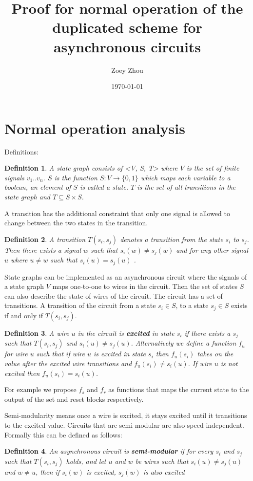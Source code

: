 \documentclass{article}
\title{Proof for normal operation of the duplicated scheme for asynchronous circuits}
\author{Zoey Zhou}
\date{\today}
\newtheorem*{definition}{Definition}
\begin{document}
\section{Normal operation analysis}
Definitions:  
\begin{definition}A state graph consists of <V, S, T> where $V$ is the set of finite signals $v_1 .. v_n$.  $S$ is the function $S: V \to \{0,1\}$ %
which maps each variable to a boolean, an element of $S$ is called a state. $T$ is the set of all transitions in the state graph and $T \subseteq S \times S$.  \end{definition}

A transition has the additional constraint that only one signal is allowed to change between the two states in the transition.
\begin{definition}A transition $T(s_i, s_j)$ denotes a transition from the state $s_i$ to $s_j$.  Then there exists a signal $w$ such that $s_i(w)\neq s_j(w)$ and for any other signal $u$ where $u \neq w$ such that $s_i(u)=s_j(u)$ . 
\end{definition}

State graphs can be implemented as an asynchronous circuit where the signals of a state graph $V$ maps one-to-one to wires in the circuit. %
Then the set of states $S$ can also describe the state of wires of the circuit.  The circuit has a set of transitions.  A transition of the circuit from a state $s_i \in S$, to a state $s_j \in S$ exists if and only if $T(s_i, s_j)$.%
\begin{definition}A wire $u$ in the circuit is \textbf{excited} in state $s_i$ if there exists a $s_j$ such that $T(s_i,s_j)$ and $s_i(u) \neq s_j(u)$.  Alternatively we define a function $f_u$ for wire $u$ such that if wire $u$ is excited in state $s_i$ then $f_u(s_i)$ takes on the value after the excited wire transitions and $f_u(s_i)\neq s_i(u)$.  If wire $u$ is not excited then $f_u(s_i)= s_i(u)$. \end{definition}
For example we propose $f_s$ and $f_r$ as functions that maps the current state to the output of the set and reset blocks respectively.

Semi-modularity means once a wire is excited, it stays excited until it transitions to the excited value.  Circuits that are semi-modular are also speed independent.  Formally this can be defined as follows:
\begin{definition}An asynchronous circuit is \textbf{semi-modular} if for every $s_i$ and $s_j$ such that $T(s_i,s_j)$ holds, and let $u$ and $w$ be wires such that $s_i(u) \neq s_j(u)$ and $w\neq u$, then if $s_i(w)$ is excited, $s_j(w)$ is also excited \end{definition}
\end{document}
